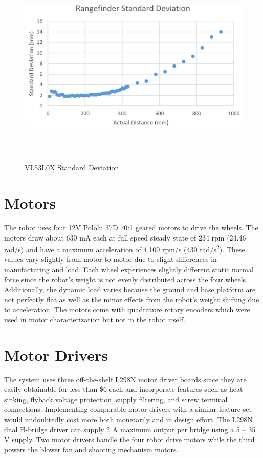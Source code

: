 \begin{figure}[H]   %
	\centering \includegraphics[width=6in, height=3.85in, keepaspectratio]{figures/rangefinder_stddev.png}
	\caption{VL53L0X Standard Deviation}\label{fig:rangefinder_stddev}
\end{figure}

\section{Motors}
The robot uses four 12V Pololu 37D 70:1 geared motors to drive the wheels. The motors draw about 630 mA each at full speed steady state of 234 rpm (24.46 rad/s) and have a maximum acceleration of 4,100 rpm/s (430 rad/s\textsuperscript{2}). These values vary slightly from motor to motor due to slight differences in manufacturing and load. Each wheel experiences slightly different static normal force since the robot's weight is not evenly distributed across the four wheels. Additionally, the dynamic load varies because the ground and base platform are not perfectly flat as well as the minor effects from the robot's weight shifting due to acceleration. The motors come with quadrature rotary encoders which were used in motor characterization but not in the robot itself.

\section{Motor Drivers}
The system uses three off-the-shelf L298N motor driver boards since they are easily obtainable for less than \$6 each and incorporate features such as heat-sinking, flyback voltage protection, supply filtering, and screw terminal connections. Implementing comparable motor drivers with a similar feature set would undoubtedly cost more both monetarily and in design effort. The L298N dual H-bridge driver can supply 2 A maximum output per bridge using a 5 -- 35 V supply. Two motor drivers handle the four robot drive motors while the third powers the blower fan and shooting mechanism motors. 

